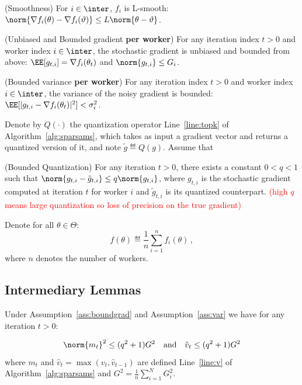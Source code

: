 \documentclass[11pt]{article}
\begin{document}
\begin{assumption}\label{ass:smooth}(Smoothness)
For $i \in \inter$, $f_i$ is  L-smooth: $\norm{\nabla f_i (\theta) - \nabla f_i (\vartheta)} \leq L \norm{\theta-\vartheta}$.
\end{assumption}

\begin{assumption}\label{ass:boundgrad}(Unbiased and Bounded gradient \textbf{per worker})
For any iteration index $t >0$ and worker index $i \in \inter$, the stochastic gradient is unbiased and bounded from above: $\EE[g_{t,i}] = \nabla f_i(\theta_t)$ and $\norm{g_{t,i}} \leq G_i$.
\end{assumption}

\begin{assumption}\label{ass:quant}(Bounded variance \textbf{per worker})
For any iteration index $t >0$ and worker index $i \in \inter$, the variance of the noisy gradient is bounded: $\EE[|g_{t,i} - \nabla f_i(\theta_t)|^2] < \sigma_i^2$.
\end{assumption}

Denote by $Q(\cdot)$ the quantization operator Line~\ref{line:topk} of Algorithm~\ref{alg:sparsams}, which takes as input a gradient vector and returns a quantized version of it, and note $\tilde{g} \eqdef Q(g)$.
Assume that
\begin{assumption}\label{ass:var}(Bounded Quantization)
For any iteration $t >0$, there exists a constant $0 < q < 1$ such that $\norm{g_{t,i} - \tilde{g}_{t,i}} \leq q \norm{g_{t,i}}$, where $g_{t,i}$ is the stochastic gradient computed at iteration $t$ for worker $i$ and $\tilde{g}_{t,i}$ is its quantized counterpart. \textcolor{red}{(high $q$ means large quantization so loss of precision on the true gradient)}
\end{assumption}


Denote for all $\theta \in \Theta$:
\begin{equation}\label{eq:obj}
f(\theta) \eqdef  \frac{1}{n} \sum_{i=1}^n f_i(\theta) \, ,
\end{equation} 
where $n$ denotes the number of workers.



\subsection{Intermediary Lemmas}

\begin{Lemma}\label{lem:bound}
Under Assumption~\ref{ass:boundgrad} and Assumption~\ref{ass:var} we have for any iteration $t >0$:

\begin{equation}
\norm{m_t}^2 \leq (q^2+1) G^2 \quad \textrm{and} \quad \hat v_t \leq (q^2+1) G^2
\end{equation}
where $m_t$ and $\hat v_t=\max(v_t,\hat v_{t-1})$ are defined Line~\ref{line:v} of Algorithm~\ref{alg:sparsams} and $G^2 = \frac{1}{n}\sum_{i=1}^N  G_{i}^2$.
\end{Lemma}
\end{document}
